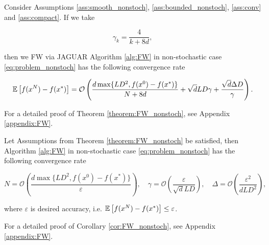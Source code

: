         \begin{theorem}
        \label{theorem:FW_nonstoch}
            Consider Assumptions \ref{ass:smooth_nonstoch}, \ref{ass:bounded_nonstoch}, \ref{ass:conv} and \ref{ass:compact}.
            If we take 
            
            $$\gamma_k = \frac{4}{k + 8d},$$
            
            then we FW via JAGUAR Algorithm \ref{alg:FW} in non-stochastic case \eqref{eq:problem_nonstoch} has the following convergence rate
    
            \begin{equation*}
                \mathbb{E}\left[ f(x^{N}) - f(x^*) \right] 
                =
                \mathcal{O} \left( \frac{d \max\{L D^2, f(x^0) - f(x^*)\}}{N + 8d}
                + \sqrt{d} L D \gamma + \frac{\sqrt{d} \Delta D}{\gamma}\right).
            \end{equation*}
        \end{theorem}

        For a detailed proof of Theorem \ref{theorem:FW_nonstoch}, see Appendix \ref{appendix:FW}.

        \begin{corollary}
        \label{cor:FW_nonstoch}
            Let Assumptions from Theorem \ref{theorem:FW_nonstoch} be satisfied, then Algorithm \ref{alg:FW} in non-stochastic case \eqref{eq:problem_nonstoch} has the following convergence rate

            \begin{equation*}
                N = \mathcal{O} \left( \frac{d \max\{L D^2, f(x^0) - f(x^*)\}}{\varepsilon} \right), \quad
                \gamma = \mathcal{O} \left(\frac{\varepsilon}{\sqrt{d} L D} \right), \quad
                \Delta = \mathcal{O} \left( \frac{\varepsilon^2}{d L D^2}\right),
            \end{equation*}

            where $\varepsilon$ is desired accuracy, i.e. $\mathbb{E}\left[ f(x^N) - f(x^*) \right] \leq \varepsilon$.

        \end{corollary}

        For a detailed proof of Corollary \ref{cor:FW_nonstoch}, see Appendix \ref{appendix:FW}.
    
